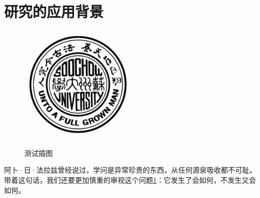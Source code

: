 \section{研究的应用背景}

\begin{figure}[htbp]
  \centering
  \includegraphics[width= 0.5\textwidth]{img/SchoolMark.jpg}\\
  \caption{测试插图}\label{fig:test1}
\end{figure}


阿卜·日·法拉兹曾经说过，学问是异常珍贵的东西，从任何源泉吸收都不可耻。带着这句话，我们还要更加慎重的审视这个问题\ref{fig:test1}：它发生了会如何，不发生又会如何。